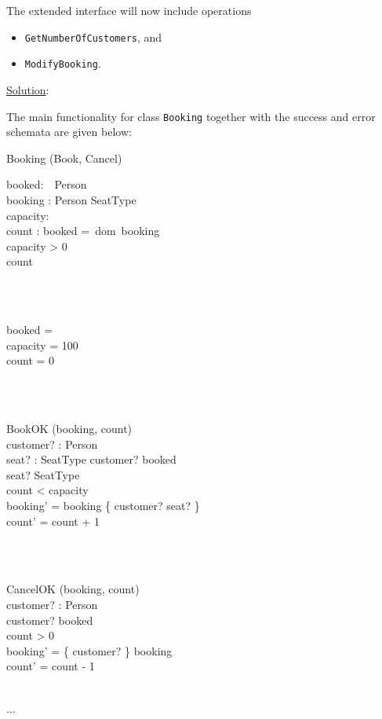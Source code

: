 \documentclass[12pt]{article}
\begin{document}
\noindent The extended interface will now include operations

\begin{itemize}

\item \texttt{GetNumberOfCustomers}, and
\item \texttt{ModifyBooking}.

\end{itemize}

\newpage

\noindent \underline{Solution}:

\noindent The main functionality for class \texttt{Booking} together with the success and error schemata are given below:

\begin{class}{Booking}
\also
\upharpoonright (Book, Cancel) \\
\begin{state}
booked:~~Person\\
booking : Person \pinj SeatType\\
capacity: \\
count : 
\where
booked =~dom~booking\\
capacity > 0\\
count 
\end{state} \\
\ \\
\begin{init}
booked = \emptyset \\
capacity = 100\\
count = 0
\end{init} \\
\ \\
\begin{op}{BookOK}
\Delta (booking, count) \\
customer? : Person\\
seat? : SeatType
\ST
customer? \notin booked\\
seat? \notin \ran SeatType\\
count < capacity\\
booking' = booking \cup \{ customer? \mapsto seat? \}\\
count' = count + 1
\end{op}\\
\ \\
\begin{op}{CancelOK}
\Delta (booking, count) \\
customer? : Person\\
\ST
customer? \in booked\\
count > 0\\
booking' = \{ customer? \} \ndres booking\\
count' = count - 1
\end{op}\\
...\\
\end{class}
\end{document}

